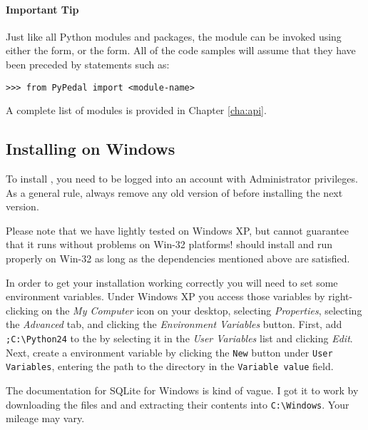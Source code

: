 \paragraph*{Important Tip} \label{sec:tip:from-pypedal-import} Just like all Python modules and packages, the \PyPedal{} module can be invoked using either the  form, or the  form.  All of the code samples will assume that they have been preceded by statements such as:
\begin{verbatim}
>>> from PyPedal import <module-name>
\end{verbatim}
A complete list of modules is provided in Chapter \ref{cha:api}.
\subsection{Installing on Windows}
\label{sec:installing-windows}
To install \PyPedal{}, you need to be logged into an account with Administrator privileges.  As a general rule, always remove any old version of \PyPedal{} before installing the next version.

Please note that we have lightly tested \PyPedal{} on Windows XP, but cannot guarantee that it runs without problems on Win-32 platforms!  \PyPedal{} should install and run properly on Win-32 as long as the dependencies mentioned above are satisfied.

In order to get your installation working correctly you will need to set some environment variables.  Under Windows XP you access those variables by right-clicking on the \emph{My Computer} icon on your desktop, selecting \emph{Properties}, selecting the \emph{Advanced} tab, and clicking the \emph{Environment Variables} button.  First, add \texttt{;C:\textbackslash{}Python24} to the  by selecting it in the \emph{User Variables} list and clicking \emph{Edit}.  Next, create a  environment variable by clicking the \texttt{New} button under \texttt{User Variables}, entering the path to the \PyPedal{} directory in the \texttt{Variable value} field.

The documentation for SQLite for Windows is kind of vague.  I got it to work by downloading the files  and  and extracting their contents into \texttt{C:\textbackslash{}Windows}.  Your mileage may vary.
